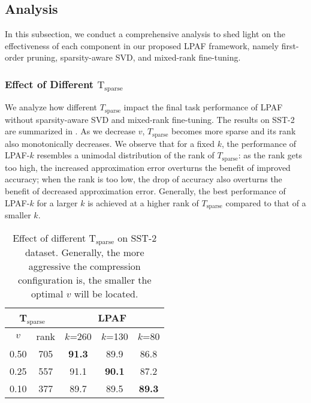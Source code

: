 \subsection{Analysis}
\label{sec:analysis}
In this subsection, we conduct a comprehensive analysis to shed light on the effectiveness of each component in our proposed LPAF framework, namely first-order pruning, sparsity-aware SVD, and mixed-rank fine-tuning.


\subsubsection{Effect of Different $\text{T}_\text{sparse}$} 	

 We analyze how different $T_\text{sparse}$ impact the final task performance of LPAF without sparsity-aware SVD and mixed-rank fine-tuning.
The results on SST-2 are summarized in . As we decrease $v$, $T_\text{sparse}$ becomes more sparse and its rank also monotonically decreases. We observe that for a fixed $k$, the performance of LPAF-$k$ resembles a unimodal distribution of the rank of $T_\text{sparse}$: as the rank gets too high, the increased approximation error overturns the benefit of improved accuracy; when the rank is too low, the drop of accuracy also overturns the benefit of decreased approximation error. Generally, the best performance of LPAF-$k$ for a larger $k$ is achieved at a higher rank of $T_\text{sparse}$ compared to that of a smaller $k$.

\begin{table}[t]
	\centering
	\footnotesize
	\begin{tabular}{ccccc}
		\toprule
		\multicolumn{2}{c|}{T$_{\text{sparse}}$}    & \multicolumn{3}{c}{LPAF}                                                   \\ 
		\midrule
		$v$  & \multicolumn{1}{c|}{rank} & $k$=260 & $k$=130                        & $k$=80                          \\ 
		\midrule
		0.50 & \multicolumn{1}{c|}{705}  & \textbf{91.3}    & 89.9                           & 86.8                            \\
		0.25 & \multicolumn{1}{c|}{557}  & 91.1    & \textbf{90.1} & 87.2                            \\
		0.10 & \multicolumn{1}{c|}{377}  & 89.7    & 89.5                           & \textbf{89.3 } \\ 
		\bottomrule
	\end{tabular}
   \caption{Effect of different T$_\text{sparse}$ on SST-2 dataset. Generally, the more aggressive the compression configuration is, the smaller the optimal $v$ will be located.}
   \label{table:diffsparse}
\end{table}

